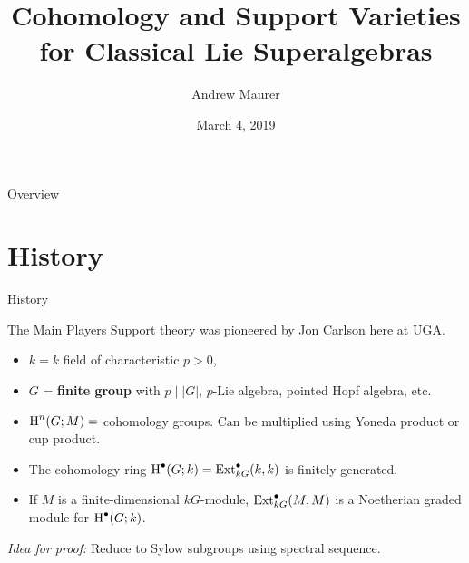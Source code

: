 \documentclass{beamer}
\newcommand{\sectionframe}[1]{\begin{frame}\begin{center}{\Huge #1 }\end{center}\end{frame}}
\begin{document}
\author[A. Maurer]{Andrew Maurer}
\date{March 4, 2019}
\title[$\H^\bullet$ \& $\V$ for LSA]{Cohomology and Support Varieties for Classical Lie Superalgebras}

\begin{frame}
  \maketitle
\end{frame}

\begin{frame}{Overview}
  \tableofcontents
\end{frame}

\section{History}

\sectionframe{History}

\pause
\begin{frame}{The Main Players}
  Support theory was pioneered by Jon Carlson here at UGA.
  \pause
  \begin{itemize}
    \item $k = \bar k$ field of characteristic $p > 0$,\pause
    \item $G$ = \textbf{finite group} with $p \mid |G|$, $p$-Lie algebra, pointed Hopf algebra, etc.\pause
    \item $\operatorname{H}^n(G;M) =$ cohomology groups. Can be multiplied using Yoneda product or cup product.\pause
    \end{itemize}
    \begin{theorem}[Evens, `61]
      \begin{itemize}
      \item The cohomology ring $\operatorname{H}^\bullet(G;k) = \operatorname{Ext}_{kG}^\bullet(k,k)$ is finitely generated.
      \item If $M$ is a finite-dimensional $kG$-module, $\operatorname{Ext}_{kG}^\bullet(M,M)$ is a Noetherian graded module for $\operatorname{H}^\bullet(G;k)$.
      \end{itemize}\pause
    \end{theorem}
    \emph{Idea for proof:} Reduce to Sylow subgroups using spectral sequence.
  \end{frame}
\end{document}

